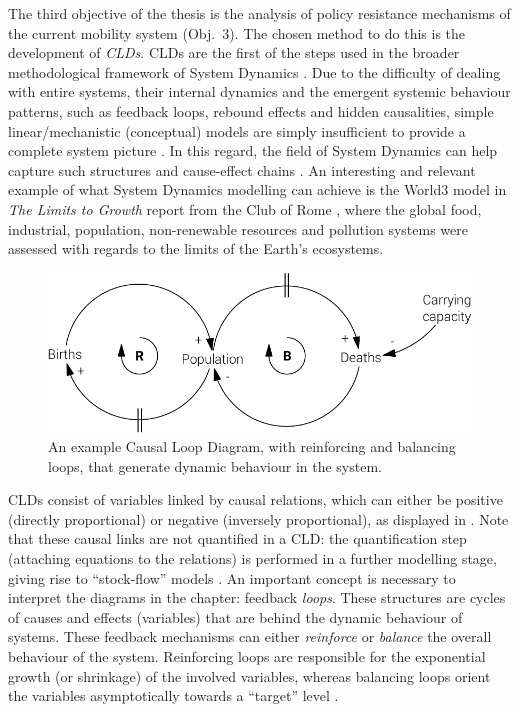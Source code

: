 The third objective of the thesis is the analysis of policy resistance mechanisms of the current mobility system (Obj.~3). The chosen method to do this is the development of \emph{\glspl{CLD}}. CLDs are the first of the steps used in the broader methodological framework of System Dynamics \parencite{ghosh2015_DynamicSystemsEveryone}. Due to the difficulty of dealing with entire systems, their internal dynamics and the emergent systemic behaviour patterns, such as feedback loops, rebound effects and hidden causalities, simple linear/mechanistic (conceptual) models are simply insufficient to provide a complete system picture \parencite{forrester1972_CounterintuitiveBehaviorSocial}. In this regard, the field of System Dynamics can help capture such structures and cause-effect chains \parencite{hjorth2006_Navigatingtowardssustainable}. An interesting and relevant example of what System Dynamics modelling can achieve is the World3 model in \emph{The Limits to Growth} report from the Club of Rome \parencite{meadows1972_LimitsGrowthReport}, where the global food, industrial, population, non-renewable resources and pollution systems were assessed with regards to the limits of the Earth's ecosystems.

\begin{figure}
\centering
\includegraphics[width=0.8\linewidth]{figures/example-cld.pdf}
\caption[Causal Loop Diagram example]{An example Causal Loop Diagram, with reinforcing and balancing loops, that generate dynamic behaviour in the system.}
\label{f:cld-methods}
\end{figure}

CLDs consist of variables linked by causal relations, which can either be positive (directly proportional) or negative (inversely proportional), as displayed in . Note that these causal links are not quantified in a CLD: the quantification step (attaching equations to the relations) is performed in a further modelling stage, giving rise to ``stock-flow'' models \parencite{sterman2000_BusinessDynamics}. An important concept is necessary to interpret the diagrams in the  chapter: feedback \emph{loops}. These structures are cycles of causes and effects (variables) that are behind the dynamic behaviour of systems. These feedback mechanisms can either \emph{reinforce} or \emph{balance} the overall behaviour of the system. Reinforcing loops are responsible for the exponential growth (or shrinkage) of the involved variables, whereas balancing loops orient the variables asymptotically towards a ``target'' level \parencite{sterman2000_BusinessDynamics}.

